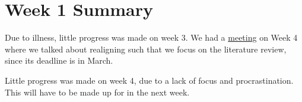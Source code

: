\documentclass{article}
\begin{document}
\section*{Week 1 Summary}

\vspace{0.5cm}

Due to illness, little progress was made on week 3. We had a \href{https://github.com/rowan-adeya/masters-project/issues/4}{meeting} on Week 4 where we talked about realigning such that we focus on the literature review, since its deadline is in March. 

Little progress was made on week 4, due to a lack of focus and procrastination. This will have to be made up for in the next week. 
\end{document}
